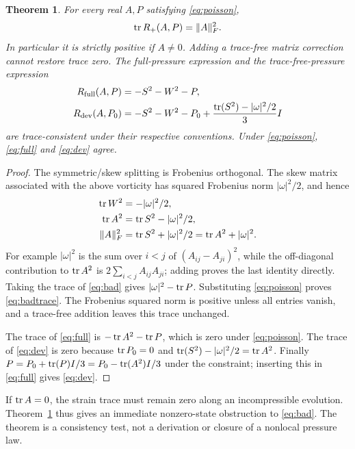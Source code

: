 \documentclass[11pt]{article}
\newtheorem{theorem}{Theorem}[section]
\begin{document}
\begin{theorem}\label{thm:trace}
For every real $A,P$ satisfying \eqref{eq:poisson},
\begin{equation}\label{eq:badtrace}
 \operatorname{tr} R_+(A,P)=\|A\|_F^2.
\end{equation}
In particular it is strictly positive if $A\ne0$. Adding a trace-free
matrix correction cannot restore trace zero. The full-pressure
expression and the trace-free-pressure expression
\begin{align}
 R_{
 \rm full}(A,P)&=-S^2-W^2-P,\label{eq:full}\\
 R_{\rm dev}(A,P_0)&=-S^2-W^2-P_0+
 \frac{\operatorname{tr}(S^2)-|\omega|^2/2}{3}I\label{eq:dev}
\end{align}
are trace-consistent under their respective conventions. Under
\eqref{eq:poisson}, \eqref{eq:full} and \eqref{eq:dev} agree.
\end{theorem}
\begin{proof}
The symmetric/skew splitting is Frobenius orthogonal. The skew matrix
associated with the above vorticity has squared Frobenius norm
$|\omega|^2/2$, and hence
\begin{align*}
 \operatorname{tr} W^2&=-|\omega|^2/2,\\
 \operatorname{tr} A^2&=\operatorname{tr} S^2-|\omega|^2/2,\\
 \|A\|_F^2&=\operatorname{tr} S^2+|\omega|^2/2
             =\operatorname{tr} A^2+|\omega|^2.
\end{align*}
For example $|\omega|^2$ is the sum over $i<j$ of
$(A_{ij}-A_{ji})^2$, while the off-diagonal contribution to
$\operatorname{tr} A^2$ is $2\sum_{i<j}A_{ij}A_{ji}$; adding proves the last identity
directly. Taking the trace of \eqref{eq:bad} gives
$|\omega|^2-\operatorname{tr} P$. Substituting \eqref{eq:poisson} proves
\eqref{eq:badtrace}. The Frobenius squared norm is positive unless all
entries vanish, and a trace-free addition leaves this trace unchanged.

The trace of \eqref{eq:full} is $-\operatorname{tr} A^2-\operatorname{tr} P$, which is zero under
\eqref{eq:poisson}. The trace of \eqref{eq:dev} is zero because
$\operatorname{tr} P_0=0$ and $\operatorname{tr}(S^2)-|\omega|^2/2=\operatorname{tr} A^2$.
Finally $P=P_0+\operatorname{tr}(P)I/3=P_0-\operatorname{tr}(A^2)I/3$ under the constraint;
inserting this in \eqref{eq:full} gives \eqref{eq:dev}.
\end{proof}

If $\operatorname{tr} A=0$, the strain trace must remain zero along an incompressible
evolution. Theorem~\ref{thm:trace} thus gives an immediate nonzero-state
obstruction to \eqref{eq:bad}. The theorem is a consistency test, not
a derivation or closure of a nonlocal pressure law.
\end{document}
